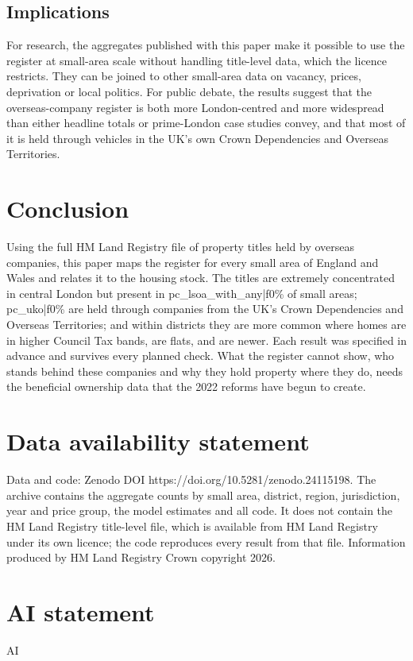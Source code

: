 \documentclass[11pt,a4paper]{article}
\begin{document}
\subsection{Implications}
For research, the aggregates published with this paper make it possible to use the register at small-area scale without handling title-level data, which the licence restricts. They can be joined to other small-area data on vacancy, prices, deprivation or local politics. For public debate, the results suggest that the overseas-company register is both more London-centred and more widespread than either headline totals or prime-London case studies convey, and that most of it is held through vehicles in the UK's own Crown Dependencies and Overseas Territories.

\section{Conclusion}\label{sec:conc}
Using the full HM Land Registry file of property titles held by overseas companies, this paper maps the register for every small area of England and Wales and relates it to the housing stock. The titles are extremely concentrated in central London but present in {{pc_lsoa_with_any|f0}}\% of small areas; {{pc_uko|f0}}\% are held through companies from the UK's Crown Dependencies and Overseas Territories; and within districts they are more common where homes are in higher Council Tax bands, are flats, and are newer. Each result was specified in advance and survives every planned check. What the register cannot show, who stands behind these companies and why they hold property where they do, needs the beneficial ownership data that the 2022 reforms have begun to create.

\section*{Data availability statement}
Data and code: Zenodo DOI https://doi.org/10.5281/zenodo.24115198. The archive contains the aggregate counts by small area, district, region, jurisdiction, year and price group, the model estimates and all code. It does not contain the HM Land Registry title-level file, which is available from HM Land Registry under its own licence; the code reproduces every result from that file. Information produced by HM Land Registry \textcopyright{} Crown copyright 2026.

\section*{AI statement}
{{AI}}
\end{document}
